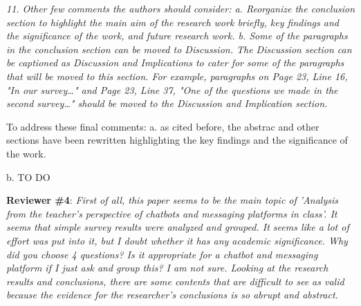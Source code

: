 \documentclass{letter}
\begin{document}
{\it 11.     Other few comments the authors should consider:
   a.   Reorganize the conclusion section to highlight the main aim of the research work briefly, key findings and the significance of the work, and future research work.
   b.   Some of the paragraphs in the conclusion section can be moved to Discussion. The Discussion section can be captioned as Discussion and Implications to cater for some of the paragraphs that will be moved to this section. For example, paragraphs on Page 23, Line 16, "In our survey…" and Page 23, Line 37, "One of the questions we made in the second survey…" should be moved to the Discussion and Implication section.}

To address these final comments:
    a. as cited before, the abstrac and other sections have been rewritten highlighting the key findings and the significance of the work.

    b. TO DO


{\bf Reviewer \#4}: {\it First of all, this paper seems to be the main topic of 'Analysis from the teacher's perspective of chatbots and messaging platforms in class'.
It seems that simple survey results were analyzed and grouped.
It seems like a lot of effort was put into it, but I doubt whether it has any academic significance.
Why did you choose 4 questions? Is it appropriate for a chatbot and messaging platform if I just ask and group this? I am not sure.
Looking at the research results and conclusions, there are some contents that are difficult to see as valid because the evidence for the researcher's conclusions is so abrupt and abstract.}
\end{document}
